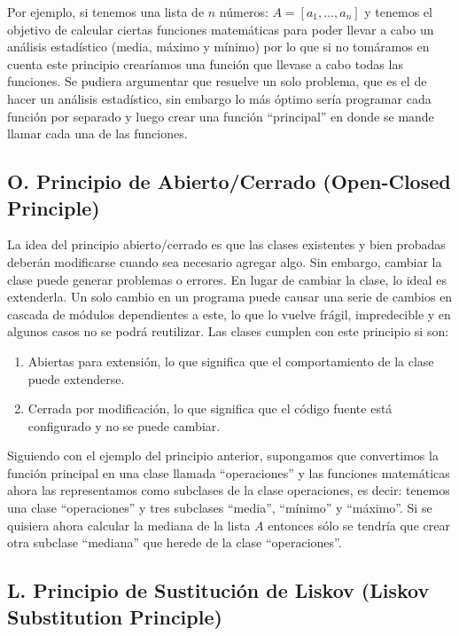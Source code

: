 \documentclass[12pt, oneside]{article}
\begin{document}
Por ejemplo, si tenemos una lista de $n$ números: $A = [a_1,\dots, a_n ]$ y tenemos el objetivo de calcular ciertas funciones matemáticas para poder llevar a cabo un análisis estadístico (media, máximo y mínimo) por lo que si no tomáramos en cuenta este principio crearíamos una función que llevase a cabo todas las funciones. Se pudiera argumentar que resuelve un solo problema, que es el de hacer un análisis estadístico, sin embargo lo más óptimo sería programar cada función por separado y luego crear una función ``principal'' en donde se mande llamar cada una de las funciones.

\subsection*{O. Principio de Abierto/Cerrado (Open-Closed Principle)}

\cite{martin2000design}

La idea del principio abierto/cerrado es que las clases existentes y bien probadas deberán modificarse cuando sea necesario agregar algo. Sin embargo, cambiar la clase puede generar problemas o errores. En lugar de cambiar la clase, lo ideal es extenderla. Un solo cambio en un programa puede causar una serie de cambios en cascada de módulos dependientes a este, lo que lo vuelve frágil, impredecible y en algunos casos no se podrá reutilizar. Las clases cumplen con este principio si son:

\begin{enumerate}
	\item Abiertas para extensión, lo que significa que el comportamiento de la clase puede extenderse.
	\item Cerrada por modificación, lo que significa que el código fuente está configurado y no se puede cambiar.
\end{enumerate}

Siguiendo con el ejemplo del principio anterior, supongamos que convertimos la función principal en una clase llamada ``operaciones'' y las funciones matemáticas ahora las representamos como subclases de la clase operaciones, es decir: tenemos una clase ``operaciones'' y tres subclases ``media'', ``mínimo'' y ``máximo''. Si se quisiera ahora calcular la mediana de la lista $A$ entonces sólo se tendría que crear otra subclase ``mediana'' que herede de la clase ``operaciones''.

\subsection*{L. Principio de Sustitución de Liskov (Liskov Substitution Principle)}
\end{document}
